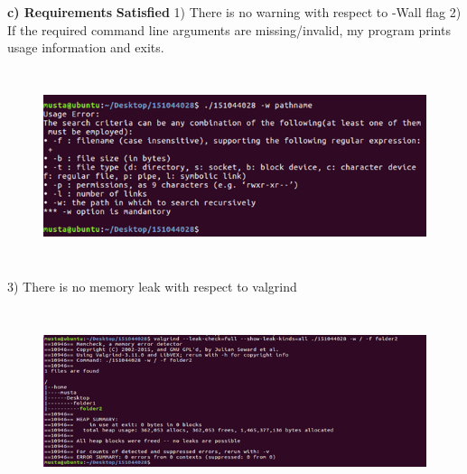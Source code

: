 \documentclass[14pt]{article}
\begin{document}
\vspace{\baselineskip}
{\fontsize{18pt}{21.6pt}\selectfont \textbf{c) Requirements}}
{\fontsize{18pt}{21.6pt}\selectfont \textbf{Satisfied}}
1) There is no warning with respect to -Wall flag
\setlength{\parskip}{0.0pt}
2) If the required command line arguments are missing/invalid, my program prints usage
\setlength{\parskip}{9.38pt}
information and exits.



\begin{figure}[H]
	\begin{Center}
		\includegraphics[width=5.97in,height=2.22in]{./media/image1.png}
	\end{Center}
\end{figure}


\vspace{\baselineskip}



\vspace{\baselineskip}3) There is no memory leak with respect to valgrind



\begin{figure}[H]
	\begin{Center}
		\includegraphics[width=6.18in,height=2.12in]{./media/image2.png}
	\end{Center}
\end{figure}
\end{document}
